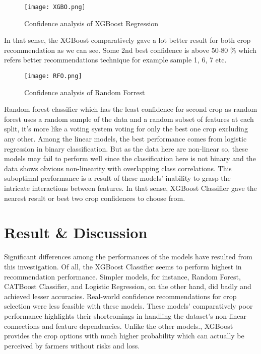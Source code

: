 \documentclass[conference]{IEEEtran}
\begin{document}
\begin{figure}[h]
    \centering
    \texttt{[image: XGBO.png]}
    \caption{Confidence analysis of XGBoost Regression}
    \label{fig:xgboost}
\end{figure}



In that sense, the XGBoost comparatively gave a lot better result for both crop recommendation as we can see. Some 2nd best confidence is above 50-80 \% which refers better recommendations technique for example sample 1, 6, 7 etc.

\begin{figure}[h]
    \centering
    \texttt{[image: RFO.png]}
    \caption{Confidence analysis of Random Forrest}
    \label{fig:rf}
\end{figure}


Random forest classifier which has the least confidence for second crop as random forest uses a random sample of the data and a random subset of features at each split, it’s more like a voting system voting for only the best one crop excluding any other.\cite{ibm2025}  
Among the linear models, the best performance comes from logistic regression in binary classification. But as the data here are non-linear so, these models may fail to perform well since the classification here is not binary and the data shows obvious non-linearity with overlapping class correlations. This suboptimal performance is a result of these models' inability to grasp the intricate interactions between features. In that sense, XGBoost Classifier gave the nearest result or best two crop confidences to choose from.

\section{Result \& Discussion}

Significant differences among the performances of the models have resulted from this investigation. Of all, the XGBoost Classifier seems to perform highest in recommendation performance. Simpler models, for instance, Random Forest, CATBoost Classifier, and Logistic Regression, on the other hand, did badly and achieved lesser accuracies. Real-world confidence recommendations for crop selection were less feasible with these models. These models' comparatively poor performance highlights their shortcomings in handling the dataset's non-linear connections and feature dependencies. Unlike the other models., XGBoost provides the crop options with much higher probability which can actually be perceived by farmers without risks and loss. 
\end{document}

